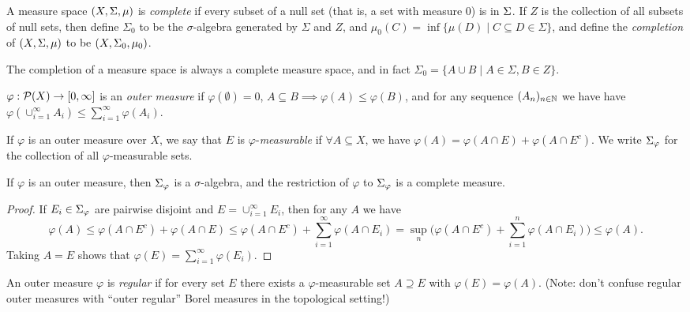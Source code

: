 \begin{defn} A measure space $(X, \Sigma, \mu)$ is \emph{complete} if every subset of a null set (that is, a set with measure $0$) is in $\Sigma$. If $Z$ is the collection of all subsets of null sets, then define $\Sigma_0$ to be the $\sigma$-algebra generated by $\Sigma$ and $Z$, and $\mu_0(C) = \inf\{\mu(D) \mid C \subseteq D \in \Sigma\}$, and define the \emph{completion} of $(X,\Sigma,\mu)$ to be $(X,\Sigma_0,\mu_0)$.
\end{defn}

\begin{prop} The completion of a measure space is always a complete measure space, and in fact $\Sigma_0 = \{A \cup B \mid A \in \Sigma, B \in Z\}$.
\end{prop}

\begin{defn} $\varphi : \mathcal{P}(X) \rightarrow [0,\infty]$ is an \emph{outer measure} if $\varphi(\emptyset) = 0$, $A \subseteq B \implies \varphi(A) \le \varphi(B)$, and for any sequence $(A_n)_{n\in \mathbb{N}}$ we have have $\varphi(\cup_{i=1}^\infty A_i) \le \sum_{i=1}^\infty \varphi(A_i)$.
\end{defn}

\begin{defn} If $\varphi$ is an outer measure over $X$, we say that $E$ is $\varphi$-\emph{measurable} if $\forall A \subseteq X$, we have $\varphi(A) = \varphi(A\cap E) + \varphi(A\cap E^c)$. We write $\Sigma_\varphi$ for the collection of all $\varphi$-measurable sets.
\end{defn}

\begin{thm} If $\varphi$ is an outer measure, then $\Sigma_\varphi$ is a $\sigma$-algebra, and the restriction of $\varphi$ to $\Sigma_\varphi$ is a complete measure.
\end{thm}
\begin{proof} If $E_i \in \Sigma_\varphi$ are pairwise disjoint and $E = \cup_{i=1}^\infty E_i$, then for any $A$ we have
\[
\varphi(A) \le \varphi(A\cap E^c) + \varphi(A\cap E) \le \varphi(A\cap E^c) + \sum_{i=1}^\infty \varphi(A\cap E_i) = \sup_n \Big(\varphi(A\cap E^c) + \sum_{i=1}^n \varphi(A\cap E_i)\Big) \le \varphi(A).
\]
Taking $A = E$ shows that $\varphi(E) = \sum_{i=1}^\infty \varphi(E_i)$.
\end{proof}

\begin{defn} An outer measure $\varphi$ is \emph{regular} if for every set $E$ there exists a $\varphi$-measurable set $A \supseteq E$ with $\varphi(E) = \varphi(A)$. (Note: don't confuse regular outer measures with ``outer regular'' Borel measures in the topological setting!)
\end{defn}

